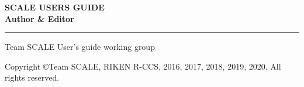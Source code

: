 \newpage
\thispagestyle{empty}

\vspace{10mm}
{\large{\bf SCALE USERS GUIDE}}\\


\vspace{10mm}
{\large{\bf Author \& Editor}}\\
\hrule width 90mm
\begin{tabbing}
Team SCALE User's guide working group\\
\end{tabbing}


\vspace{110mm}
\begin{flushright}

\vspace{10mm}
Copyright \copyright Team SCALE, RIKEN R-CCS, 2016, 2017, 2018, 2019, 2020. All rights reserved.
\end{flushright}

